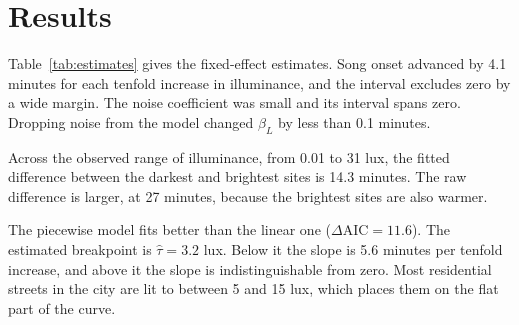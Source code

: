 \section{Results}
\label{sec:results}

Table~\ref{tab:estimates} gives the fixed-effect estimates. Song onset advanced by 4.1 minutes for each tenfold increase in illuminance, and the interval excludes zero by a wide margin. The noise coefficient was small and its interval spans zero. Dropping noise from the model changed $\beta_L$ by less than 0.1 minutes.



Across the observed range of illuminance, from 0.01 to 31 lux, the fitted difference between the darkest and brightest sites is 14.3 minutes. The raw difference is larger, at 27 minutes, because the brightest sites are also warmer.

The piecewise model fits better than the linear one ($\Delta\mathrm{AIC} = 11.6$). The estimated breakpoint is $\hat{\tau} = 3.2$ lux. Below it the slope is 5.6 minutes per tenfold increase, and above it the slope is indistinguishable from zero. Most residential streets in the city are lit to between 5 and 15 lux, which places them on the flat part of the curve.

